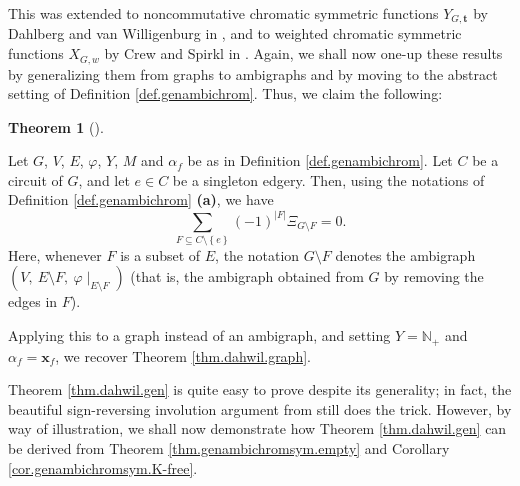 \documentclass[numbers=enddot,12pt,final,onecolumn,notitlepage]{scrartcl}%
\theoremstyle{definition}
\newtheorem{theo}{Theorem}[section]
\newenvironment{theorem}[1][]
{\begin{theo}[#1]\begin{leftbar}}
{\end{leftbar}\end{theo}}
\let\sumnonlimits\sum
\renewcommand{\sum}{\sumnonlimits\limits}
\begin{document}
This was extended to noncommutative chromatic symmetric functions
$Y_{G,\mathbf{t}}$ by Dahlberg and van Willigenburg in \cite[Proposition
3.6]{DahWil19}, and to weighted chromatic symmetric functions $X_{G,w}$ by
Crew and Spirkl in \cite[Theorem 6]{CreSpi19}. Again, we shall now one-up
these results by generalizing them from graphs to ambigraphs and by moving to
the abstract setting of Definition \ref{def.genambichrom}. Thus, we claim the following:

\begin{theorem}
\label{thm.dahwil.gen}Let $G$, $V$, $E$, $\varphi$, $Y$, $M$ and $\alpha_{f}$
be as in Definition \ref{def.genambichrom}. Let $C$ be a circuit of $G$, and
let $e\in C$ be a singleton edgery. Then, using the notations of Definition
\ref{def.genambichrom} \textbf{(a)}, we have%
\[
\sum_{F\subseteq C\setminus\left\{  e\right\}  }\left(  -1\right)
^{\left\vert F\right\vert }\Xi_{G\setminus F}=0.
\]
Here, whenever $F$ is a subset of $E$, the notation $G\setminus F$ denotes the
ambigraph $\left(  V,\ E\setminus F,\ \varphi\mid_{E\setminus F}\right)  $
(that is, the ambigraph obtained from $G$ by removing the edges in $F$).
\end{theorem}

Applying this to a graph instead of an ambigraph, and setting $Y=\mathbb{N}%
_{+}$ and $\alpha_{f}=\mathbf{x}_{f}$, we recover Theorem
\ref{thm.dahwil.graph}.

Theorem \ref{thm.dahwil.gen} is quite easy to prove despite its generality; in
fact, the beautiful sign-reversing involution argument from \cite[proof of
Proposition 3.6]{DahWil19} still does the trick. However, by way of
illustration, we shall now demonstrate how Theorem \ref{thm.dahwil.gen} can be
derived from Theorem \ref{thm.genambichromsym.empty} and Corollary
\ref{cor.genambichromsym.K-free}.
\end{document}
